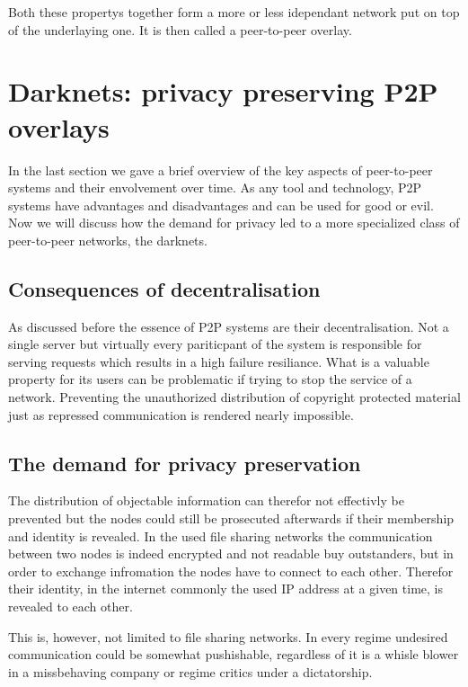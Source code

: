 Both these propertys together form a more or less idependant network put on top of the underlaying one. It is then called a peer-to-peer overlay.


\section{Darknets: privacy preserving P2P overlays}

In the last section we gave a brief overview of the key aspects of peer-to-peer systems and their envolvement over time. As any tool and technology, P2P systems have advantages and disadvantages and can be used for good or evil. Now we will discuss how the demand for privacy led to a more specialized class of peer-to-peer networks, the darknets.

\subsection{Consequences of decentralisation}

As discussed before the essence of P2P systems are their decentralisation. Not a single server but virtually every pariticpant of the system is responsible for serving requests which results in a high failure resiliance. What is a valuable property for its users can be problematic if trying to stop the service of a network. Preventing the unauthorized distribution of copyright protected material just as repressed communication is rendered nearly impossible. 

\subsection{The demand for privacy preservation}

The distribution of objectable information can therefor not effectivly be prevented but the nodes could still be prosecuted afterwards if their membership and identity is revealed. In the used file sharing networks the communication between two nodes is indeed encrypted and not readable buy outstanders, but in order to exchange infromation the nodes have to connect to each other. Therefor their identity, in the internet commonly the used IP address at a given time, is revealed to each other.

This is, however, not limited to file sharing networks. In every regime undesired communication could be somewhat pushishable, regardless of it is a whisle blower in a missbehaving company or regime critics under a dictatorship. 

